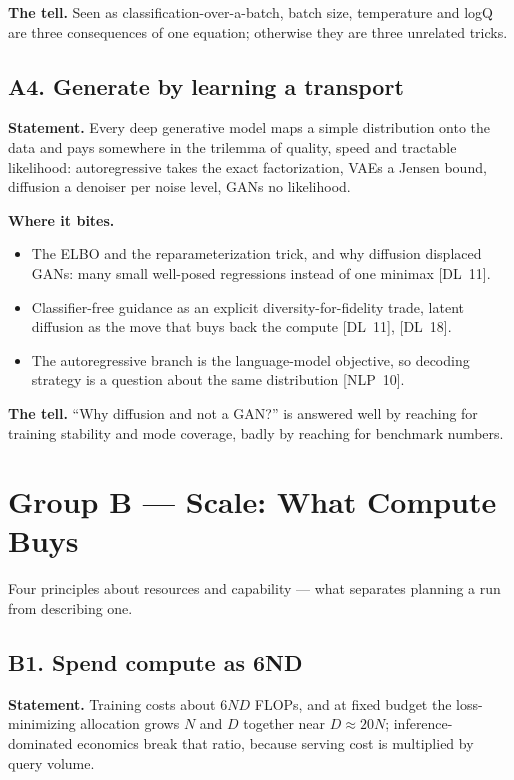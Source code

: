 \textbf{The tell.} Seen as classification-over-a-batch, batch size, temperature and logQ are three consequences of one equation; otherwise they are three unrelated tricks.

\subsection*{A4. Generate by learning a transport}

\textbf{Statement.} Every deep generative model maps a simple distribution onto the data and pays somewhere in the trilemma of quality, speed and tractable likelihood: autoregressive takes the exact factorization, VAEs a Jensen bound, diffusion a denoiser per noise level, GANs no likelihood.

\textbf{Where it bites.}
\begin{itemize}[itemsep=1pt,topsep=2pt,leftmargin=1.3em]
\item The ELBO and the reparameterization trick, and why diffusion displaced GANs: many small well-posed regressions instead of one minimax [DL~11].
\item Classifier-free guidance as an explicit diversity-for-fidelity trade, latent diffusion as the move that buys back the compute [DL~11], [DL~18].
\item The autoregressive branch is the language-model objective, so decoding strategy is a question about the same distribution [NLP~10].
\end{itemize}

\textbf{The tell.} ``Why diffusion and not a GAN?'' is answered well by reaching for training stability and mode coverage, badly by reaching for benchmark numbers.

\section*{Group B --- Scale: What Compute Buys}

Four principles about resources and capability --- what separates planning a run from describing one.

\subsection*{B1. Spend compute as 6ND}

\textbf{Statement.} Training costs about $6ND$ FLOPs, and at fixed budget the loss-minimizing allocation grows $N$ and $D$ together near $D \approx 20N$; inference-dominated economics break that ratio, because serving cost is multiplied by query volume.

